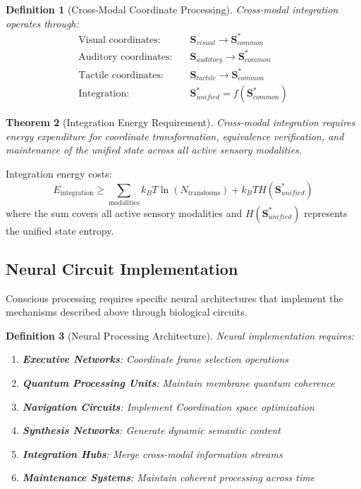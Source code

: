 \documentclass[12pt,a4paper]{article}
\newtheorem{theorem}{Theorem}[section]
\newtheorem{definition}[theorem]{Definition}
\begin{document}
\begin{definition}[Cross-Modal Coordinate Processing]
Cross-modal integration operates through:
\begin{align}
\text{Visual coordinates:} \quad &\mathbf{S}_{visual} \rightarrow \mathbf{S}^*_{common} \\
\text{Auditory coordinates:} \quad &\mathbf{S}_{auditory} \rightarrow \mathbf{S}^*_{common} \\
\text{Tactile coordinates:} \quad &\mathbf{S}_{tactile} \rightarrow \mathbf{S}^*_{common} \\
\text{Integration:} \quad &\mathbf{S}^*_{unified} = f(\mathbf{S}^*_{common})
\end{align}
\end{definition}

\begin{theorem}[Integration Energy Requirement]
Cross-modal integration requires energy expenditure for coordinate transformation, equivalence verification, and maintenance of the unified state across all active sensory modalities.
\end{theorem}

Integration energy costs:
\begin{equation}
E_{\text{integration}} \geq \sum_{\text{modalities}} k_B T \ln(N_{\text{transforms}}) + k_B T H(\mathbf{S}^*_{unified})
\end{equation}
where the sum covers all active sensory modalities and $H(\mathbf{S}^*_{unified})$ represents the unified state entropy.

\subsection{Neural Circuit Implementation}

Conscious processing requires specific neural architectures that implement the mechanisms described above through biological circuits.

\begin{definition}[Neural Processing Architecture]
Neural implementation requires:
\begin{enumerate}
\item \textbf{Executive Networks}: Coordinate frame selection operations
\item \textbf{Quantum Processing Units}: Maintain membrane quantum coherence
\item \textbf{Navigation Circuits}: Implement Coordination space optimization
\item \textbf{Synthesis Networks}: Generate dynamic semantic content
\item \textbf{Integration Hubs}: Merge cross-modal information streams
\item \textbf{Maintenance Systems}: Maintain coherent processing across time
\end{enumerate}
\end{definition}
\end{document}
